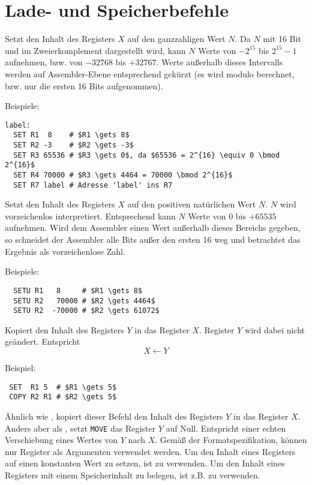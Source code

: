 \section{Lade- und Speicherbefehle}
\label{sec:Lade-Speicher-Instruktionen}

Setzt den Inhalt des Registers $X$ auf den ganzzahligen Wert $N$.
Da $N$ mit 16 Bit und im Zweierkomplement dargestellt wird, kann $N$ Werte von
$-2^{15}$ bis $2^{15} - 1$ aufnehmen, bzw. von $-32768$ bis $+32767$.
Werte außerhalb dieses Intervalls werden auf Assembler-Ebene entsprechend
gekürzt (es wird modulo berechnet, bzw. nur die ersten 16 Bits aufgenommen).

Beispiele:
\begin{lstlisting}
label:
  SET R1  8    # $R1 \gets 8$
  SET R2 -3    # $R2 \gets -3$
  SET R3 65536 # $R3 \gets 0$, da $65536 = 2^{16} \equiv 0 \bmod 2^{16}$
  SET R4 70000 # $R3 \gets 4464 = 70000 \bmod 2^{16}$
  SET R7 label # Adresse 'label' ins R7
\end{lstlisting}


Setzt den Inhalt des Registers $X$ auf den positiven natürlichen Wert $N$.
$N$ wird vorzeichenlos interpretiert. Entsprechend kann $N$ Werte von $0$ bis
$+65535$ aufnehmen.
Wird dem Assembler einen Wert außerhalb dieses Bereichs gegeben, so
schneidet der Assembler alle Bits außer den ersten 16 weg und betrachtet das
Ergebnis als vorzeichenlose Zahl.

Beispiele:
\begin{lstlisting}
  SETU R1   8     # $R1 \gets 8$
  SETU R2   70000 # $R2 \gets 4464$
  SETU R2  -70000 # $R2 \gets 61072$
\end{lstlisting}


Kopiert den Inhalt des Registers $Y$ in das Register $X$. Register $Y$ wird
dabei nicht geändert. Entspricht
\[
    X \gets Y
\]

Beispiel:
\begin{lstlisting}
 SET  R1 5  # $R1 \gets 5$
 COPY R2 R1 # $R2 \gets 5$
\end{lstlisting}



Ähnlich wie , kopiert dieser Befehl den Inhalt des Registers $Y$
in das Register $X$.
Anders aber als , setzt \texttt{MOVE} das Register $Y$ auf Null.
Entspricht einer echten Verschiebung eines Wertes von $Y$ nach $X$.
Gemäß der Formatspezifikation, können nur Register als Argumenten verwendet
werden. Um den Inhalt eines Registers auf einen konstanten Wert zu setzen, ist
 zu verwenden. Um den Inhalt eines Registers mit einem Speicherinhalt
zu belegen, ist z.B.  zu verwenden.

